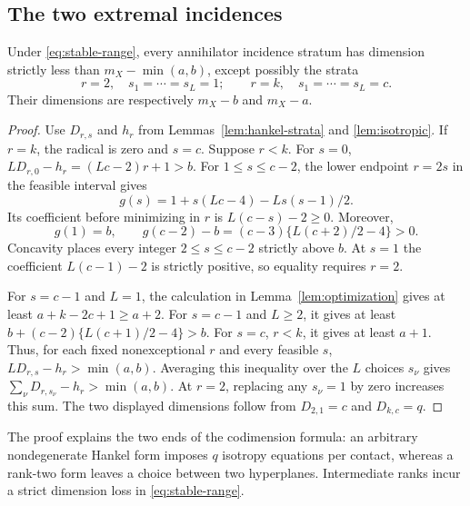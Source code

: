 \subsection{The two extremal incidences}
\begin{lemma}\label{lem:strict-gap}
Under \eqref{eq:stable-range}, every annihilator incidence stratum has dimension strictly less than $m_X-\min(a,b)$, except possibly the strata
\[
 r=2,\quad s_1=\cdots=s_L=1;
 \qquad
 r=k,\quad s_1=\cdots=s_L=c.
\]
Their dimensions are respectively $m_X-b$ and $m_X-a$.
\end{lemma}
\begin{proof}
Use $D_{r,s}$ and $h_r$ from Lemmas~\ref{lem:hankel-strata} and \ref{lem:isotropic}. If $r=k$, the radical is zero and $s=c$. Suppose $r<k$. For $s=0$, $LD_{r,0}-h_r=(Lc-2)r+1>b$. For $1\le s\le c-2$, the lower endpoint $r=2s$ in the feasible interval gives
\[
 g(s)=1+s(Lc-4)-Ls(s-1)/2.
\]
Its coefficient before minimizing in $r$ is $L(c-s)-2\ge0$. Moreover,
\[
 g(1)=b,\qquad
 g(c-2)-b=(c-3)\{L(c+2)/2-4\}>0.
\]
Concavity places every integer $2\le s\le c-2$ strictly above $b$. At $s=1$ the coefficient $L(c-1)-2$ is strictly positive, so equality requires $r=2$.

For $s=c-1$ and $L=1$, the calculation in Lemma~\ref{lem:optimization} gives at least $a+k-2c+1\ge a+2$. For $s=c-1$ and $L\ge2$, it gives at least
$b+(c-2)\{L(c+1)/2-4\}>b$. For $s=c$, $r<k$, it gives at least $a+1$. Thus, for each fixed nonexceptional $r$ and every feasible $s$, $LD_{r,s}-h_r>\min(a,b)$. Averaging this inequality over the $L$ choices $s_\nu$ gives $\sum_\nu D_{r,s_\nu}-h_r>\min(a,b)$. At $r=2$, replacing any $s_\nu=1$ by zero increases this sum. The two displayed dimensions follow from $D_{2,1}=c$ and $D_{k,c}=q$.
\end{proof}
The proof explains the two ends of the codimension formula: an arbitrary nondegenerate Hankel form imposes $q$ isotropy equations per contact, whereas a rank-two form leaves a choice between two hyperplanes. Intermediate ranks incur a strict dimension loss in \eqref{eq:stable-range}.

